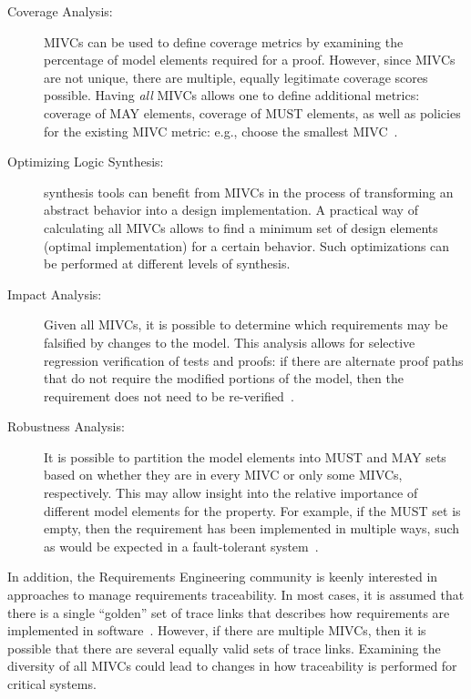 \begin{description}
    \item [Coverage Analysis:] MIVCs can be used to define coverage metrics by examining the percentage of model elements required for a proof.  However, since MIVCs are not unique, there are multiple, equally legitimate coverage scores possible.  Having \emph{all} MIVCs allows one to define additional metrics: coverage of MAY elements, coverage of MUST elements, as well as policies for the existing MIVC metric: e.g., choose the smallest MIVC~\cite{Ghass17Cov}.
    \item [Optimizing Logic Synthesis:]  synthesis tools can benefit from MIVCs in the process of transforming an abstract behavior into a design implementation. A practical way of calculating all MIVCs allows to find a minimum set of design elements (optimal implementation) for a certain behavior. Such optimizations can be performed at different levels of synthesis.
    \item [Impact Analysis:] Given all MIVCs, it is possible to determine which requirements may be falsified by changes to the model.  This analysis allows for selective regression verification of tests and proofs: if there are alternate proof paths that do not require the modified portions of the model, then the requirement does not need to be re-verified~\cite{Murugesan16:renext}.
    \item [Robustness Analysis:] It is possible to partition the model elements into MUST and MAY sets based on whether they are in every MIVC or only some MIVCs, respectively.  This may allow insight into the relative importance of different model elements for the property.  For example, if the MUST set is empty, then the requirement has been implemented in multiple ways, such as would be expected in a fault-tolerant system~\cite{Murugesan16:renext}.
\end{description}

\noindent In addition, the Requirements Engineering community is keenly interested in approaches to manage requirements traceability.  In most cases, it is assumed that there is a single ``golden'' set of trace links that describes how requirements are implemented in software~\cite{COEST,hayes2003improving,cleland2007best}. However, if there are multiple MIVCs, then it is possible that there are several equally valid sets of trace links.  Examining the diversity of all MIVCs could lead to changes in how traceability is performed for critical systems.

